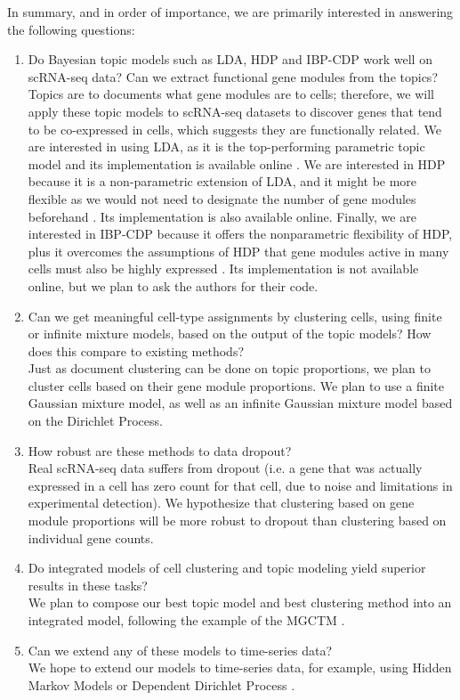\documentclass[11pt]{article}
\begin{document}
In summary, and in order of importance, we are primarily interested in answering the following questions:

\begin{enumerate}
    \item Do Bayesian topic models such as LDA, HDP and IBP-CDP work well on scRNA-seq data? Can we extract functional gene modules from the topics? \\
    Topics are to documents what gene modules are to cells; therefore, we will apply these topic models to scRNA-seq datasets to discover genes that tend to be co-expressed in cells, which suggests they are functionally related. We are interested in using LDA, as it is the top-performing parametric topic model and its implementation is available online \cite{LDA}. We are interested in HDP because it is a non-parametric extension of LDA, and it might be more flexible as we would not need to designate the number of gene modules beforehand \cite{HDP}. Its implementation is also available online. Finally, we are interested in IBP-CDP because it offers the nonparametric flexibility of HDP, plus it overcomes the assumptions of HDP that gene modules active in many cells must also be highly expressed \cite{IBP}. Its implementation is not available online, but we plan to ask the authors for their code.

    \item Can we get meaningful cell-type assignments by clustering cells, using finite or infinite mixture models, based on the output of the topic models? How does this compare to existing methods?
    \\
    Just as document clustering can be done on topic proportions, we plan to cluster cells based on their gene module proportions. We plan to use a finite Gaussian mixture model, as well as an infinite Gaussian mixture model based on the Dirichlet Process. 

    \item How robust are these methods to data dropout? \\
    Real scRNA-seq data suffers from dropout (i.e. a gene that was actually expressed in a cell has zero count for that cell, due to noise and limitations in experimental detection). We hypothesize that clustering based on gene module proportions will be more robust to dropout than clustering based on individual gene counts.
    
    \item Do integrated models of cell clustering and topic modeling yield superior results in these tasks? \\
    We plan to compose our best topic model and best clustering method into an integrated model, following the example of the MGCTM \cite{pengtao}. 
    \item Can we extend any of these models to time-series data? \\
    We hope to extend our models to time-series data, for example, using Hidden Markov Models or Dependent Dirichlet Process \cite{TS-DDP}.

\end{enumerate}
\end{document}
